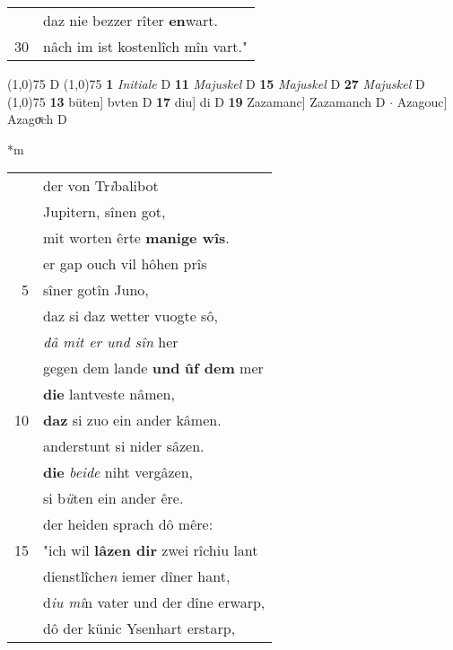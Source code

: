 \documentclass[8pt,a4paper,notitlepage]{article}
\begin{document}
\begin{table}[ht]
\begin{minipage}[t]{0.5\linewidth}
\begin{tabular}{rl}
 & daz nie bezzer rîter \textbf{en}wart.\\ 
30 & nâch im ist kostenlîch mîn vart."\\ 
\end{tabular}
\scriptsize
\line(1,0){75} \newline
D \newline
\line(1,0){75} \newline
\textbf{1} \textit{Initiale} D  \textbf{11} \textit{Majuskel} D  \textbf{15} \textit{Majuskel} D  \textbf{27} \textit{Majuskel} D  \newline
\line(1,0){75} \newline
\textbf{13} büten] bvten D \textbf{17} diu] di D \textbf{19} Zazamanc] Zazamanch D  $\cdot$ Azagouc] Azagoͮch D \newline
\end{minipage}
\hspace{0.5cm}
\begin{minipage}[t]{0.5\linewidth}
\small
\begin{center}*m
\end{center}
\begin{tabular}{rl}
 & der von Tr\textit{i}balibot\\ 
 & Jupitern, sînen got,\\ 
 & mit worten êrte \textbf{manige wîs}.\\ 
 & er gap ouch vil hôhen prîs\\ 
5 & sîner gotîn Juno,\\ 
 & daz si daz wetter vuogte sô,\\ 
 & \textit{dâ mit er und sîn} her\\ 
 & gegen dem lande \textbf{und} \textbf{ûf dem} mer\\ 
 & \textbf{die} lantveste nâmen,\\ 
10 & \textbf{daz} si zuo ein ander kâmen.\\ 
 & anderstunt si nider sâzen.\\ 
 & \textbf{die} \textit{beide} niht vergâzen,\\ 
 & si b\textit{ü}ten ein ander êre.\\ 
 & der heiden sprach dô mêre:\\ 
15 & "ich wil \textbf{lâzen dir} zwei rîchiu lant\\ 
 & dienstlîche\textit{n} iemer dîner hant,\\ 
 & d\textit{iu mî}n vater und der dîne erwarp,\\ 
 & dô der künic Ysenhart erstarp,\\ 

\end{tabular}
\end{minipage}
\end{table}
\end{document}

